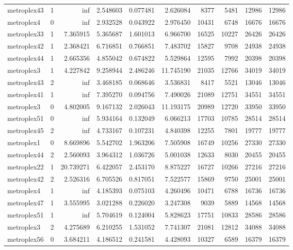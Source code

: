 \begin{longtable}{|l|r|r|r|r|r|r|r|r|r|}
metroplex43 & 1 & inf & 2.548603 & 0.077481 & 2.626084 & 8377 & 5481 & 12986 & 12986 \\
metroplex4 & 0 & inf & 2.932528 & 0.043922 & 2.976450 & 10431 & 6748 & 16676 & 16676 \\
metroplex33 & 1 & 7.365915 & 5.365687 & 1.601013 & 6.966700 & 16525 & 10227 & 26426 & 26426 \\
metroplex42 & 1 & 2.368421 & 6.716851 & 0.766851 & 7.483702 & 15827 & 9708 & 24938 & 24938 \\
metroplex44 & 1 & 2.665356 & 4.855042 & 0.674822 & 5.529864 & 12595 & 7992 & 20398 & 20398 \\
metroplex3 & 1 & 4.227842 & 9.258944 & 2.486246 & 11.745190 & 21035 & 12766 & 34019 & 34019 \\
metroplex43 & 2 & inf & 3.468185 & 0.068646 & 3.536831 & 8417 & 5521 & 13046 & 13046 \\
metroplex41 & 1 & inf & 7.395270 & 0.094756 & 7.490026 & 21089 & 12751 & 34551 & 34551 \\
metroplex3 & 0 & 4.802005 & 9.167132 & 2.026043 & 11.193175 & 20989 & 12720 & 33950 & 33950 \\
metroplex51 & 0 & inf & 5.934164 & 0.132049 & 6.066213 & 17703 & 10785 & 28514 & 28514 \\
metroplex45 & 2 & inf & 4.733167 & 0.107231 & 4.840398 & 12255 & 7801 & 19777 & 19777 \\
metroplex1 & 0 & 8.669896 & 5.542702 & 1.963206 & 7.505908 & 16749 & 10256 & 27330 & 27330 \\
metroplex44 & 2 & 2.560093 & 3.964312 & 1.036726 & 5.001038 & 12633 & 8030 & 20455 & 20455 \\
metroplex22 & 1 & 20.739271 & 6.422057 & 2.453170 & 8.875227 & 16727 & 10266 & 27216 & 27216 \\
metroplex42 & 2 & 2.526316 & 6.705526 & 0.817051 & 7.522577 & 15869 & 9750 & 25001 & 25001 \\
metroplex4 & 1 & inf & 4.185393 & 0.075103 & 4.260496 & 10471 & 6788 & 16736 & 16736 \\
metroplex47 & 1 & 3.555995 & 3.021288 & 0.226020 & 3.247308 & 9039 & 5889 & 14568 & 14568 \\
metroplex51 & 1 & inf & 5.704619 & 0.124004 & 5.828623 & 17751 & 10833 & 28586 & 28586 \\
metroplex3 & 2 & 4.275689 & 6.210255 & 1.531052 & 7.741307 & 21081 & 12812 & 34088 & 34088 \\
metroplex56 & 0 & 3.684211 & 4.186512 & 0.241581 & 4.428093 & 10327 & 6589 & 16379 & 16379 \\

\end{longtable}
